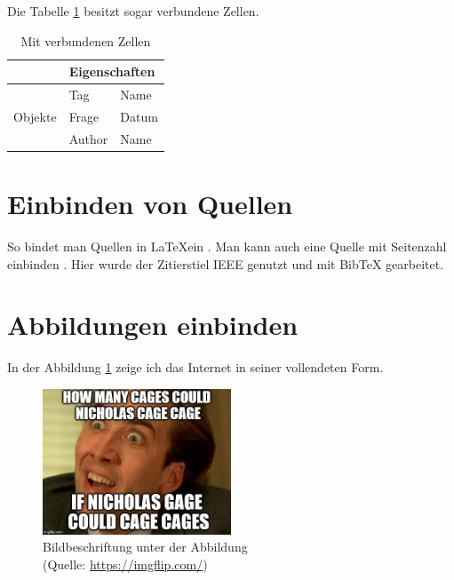 Die Tabelle \ref{table:multirow} besitzt sogar verbundene Zellen.
\begin{table}[h!]
    \centering
    \caption{Mit verbundenen Zellen}
    \label{table:multirow}
    \begin{tabular}[t]{|l|l|l|}
    \hline
                             & \multicolumn{2}{l|}{Eigenschaften} \\ \hline
    \multirow{3}{*}{Objekte} & Tag              & Name            \\ \cline{2-3} 
                             & Frage            & Datum           \\ \cline{2-3} 
                             & Author           & Name            \\ \hline
    \end{tabular}
\end{table}

\clearpage

\section{Einbinden von Quellen}\label{sec:quellen}
So bindet man Quellen in \LaTeX ein \cite{AllQuestionsSAP}.
Man kann auch eine Quelle mit Seitenzahl einbinden \cite[S. 420]{bianchiniPageRank2005}.
Hier wurde der Zitierstiel IEEE genutzt und mit BibTeX gearbeitet.

\clearpage

\section{Abbildungen einbinden}\label{sec:abbildungen}
In der Abbildung \ref{fig:nico} zeige ich das Internet in seiner vollendeten Form.
\begin{figure}
    \includegraphics[width=0.5\textwidth,angle=0]{abb/26z3fo.jpg}
    \caption[Bildbeschriftung für Abbildungsverzeichnis]{Bildbeschriftung unter der Abbildung\\ (Quelle: \url{https://imgflip.com/})}
    \label{fig:nico}
\end{figure}
\blindtext[1]

